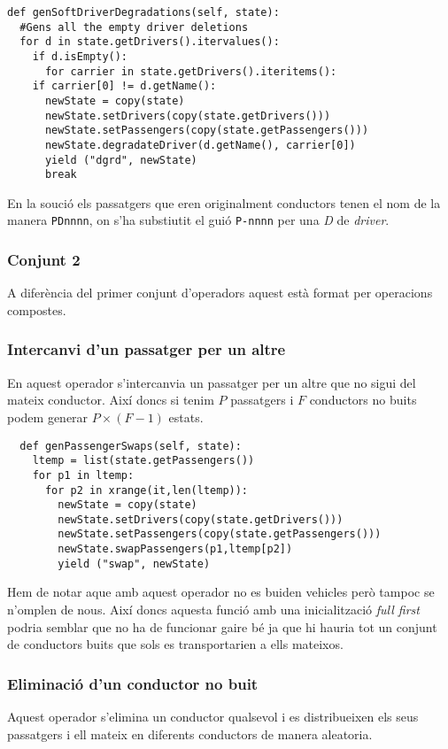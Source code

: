 \begin{verbatim}
def genSoftDriverDegradations(self, state):
  #Gens all the empty driver deletions
  for d in state.getDrivers().itervalues():
    if d.isEmpty():
      for carrier in state.getDrivers().iteritems():
	if carrier[0] != d.getName():
	  newState = copy(state)
	  newState.setDrivers(copy(state.getDrivers()))
	  newState.setPassengers(copy(state.getPassengers()))
	  newState.degradateDriver(d.getName(), carrier[0])
	  yield ("dgrd", newState)
	  break
\end{verbatim}

En la so\lgem ució els passatgers que eren originalment conductors tenen el nom de la manera \texttt{PDnnnn},
on s'ha substiutit el guió \texttt{P-nnnn} per una \emph{D} de \emph{driver}.

\subsubsection{Conjunt 2}
A diferència del primer conjunt d'operadors aquest està format per operacions compostes.

\subsubsection{Intercanvi d'un passatger per un altre}
En aquest operador s'intercanvia un passatger per un altre que no sigui del mateix conductor.
Així doncs si tenim $P$ passatgers i $F$ conductors no buits podem generar $P \times (F-1)$ estats. 

\begin{verbatim}
  def genPassengerSwaps(self, state):    
    ltemp = list(state.getPassengers())
    for p1 in ltemp:
      for p2 in xrange(it,len(ltemp)):
        newState = copy(state)
        newState.setDrivers(copy(state.getDrivers()))
        newState.setPassengers(copy(state.getPassengers()))
        newState.swapPassengers(p1,ltemp[p2])
        yield ("swap", newState)
\end{verbatim}

Hem de notar aque amb aquest operador no es buiden vehicles però tampoc se n'omplen de nous.
Així doncs aquesta funció amb una inicialització \emph{full first} podria semblar que no ha de funcionar
gaire bé ja que hi hauria tot un conjunt de conductors buits que sols es transportarien a ells mateixos.


\subsubsection{Eliminació d'un conductor no buit}
Aquest operador s'elimina un conductor qualsevol i es distribueixen els seus passatgers i ell mateix
en diferents conductors de manera aleatoria.

